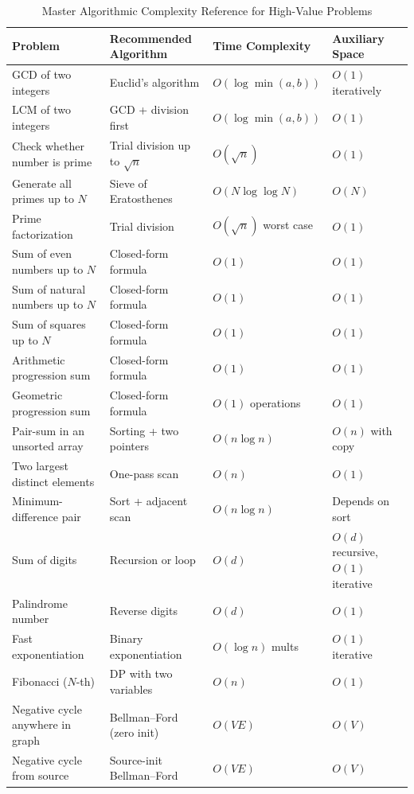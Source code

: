 \begin{table}[htbp]
\centering
\caption{Master Algorithmic Complexity Reference for High-Value Problems}
\label{tab:ch09_complexity_reference}
\begin{tabularx}{\textwidth}{p{4.2cm} p{4.2cm} p{3.2cm} X}
\toprule
\textbf{Problem} & \textbf{Recommended Algorithm} & \textbf{Time Complexity} & \textbf{Auxiliary Space} \\
\midrule
GCD of two integers & Euclid's algorithm & $O(\log\min(a,b))$ & $O(1)$ iteratively \\
LCM of two integers & GCD + division first & $O(\log\min(a,b))$ & $O(1)$ \\
Check whether number is prime & Trial division up to $\sqrt{n}$ & $O(\sqrt{n})$ & $O(1)$ \\
Generate all primes up to $N$ & Sieve of Eratosthenes & $O(N\log\log N)$ & $O(N)$ \\
Prime factorization & Trial division & $O(\sqrt{n})$ worst case & $O(1)$ \\
Sum of even numbers up to $N$ & Closed-form formula & $O(1)$ & $O(1)$ \\
Sum of natural numbers up to $N$ & Closed-form formula & $O(1)$ & $O(1)$ \\
Sum of squares up to $N$ & Closed-form formula & $O(1)$ & $O(1)$ \\
Arithmetic progression sum & Closed-form formula & $O(1)$ & $O(1)$ \\
Geometric progression sum & Closed-form formula & $O(1)$ operations & $O(1)$ \\
Pair-sum in an unsorted array & Sorting + two pointers & $O(n\log n)$ & $O(n)$ with copy \\
Two largest distinct elements & One-pass scan & $O(n)$ & $O(1)$ \\
Minimum-difference pair & Sort + adjacent scan & $O(n\log n)$ & Depends on sort \\
Sum of digits & Recursion or loop & $O(d)$ & $O(d)$ recursive, $O(1)$ iterative \\
Palindrome number & Reverse digits & $O(d)$ & $O(1)$ \\
Fast exponentiation & Binary exponentiation & $O(\log n)$ mults & $O(1)$ iterative \\
Fibonacci ($N$-th) & DP with two variables & $O(n)$ & $O(1)$ \\
Negative cycle anywhere in graph & Bellman--Ford (zero init) & $O(VE)$ & $O(V)$ \\
Negative cycle from source & Source-init Bellman--Ford & $O(VE)$ & $O(V)$ \\
\bottomrule
\end{tabularx}
\end{table}

